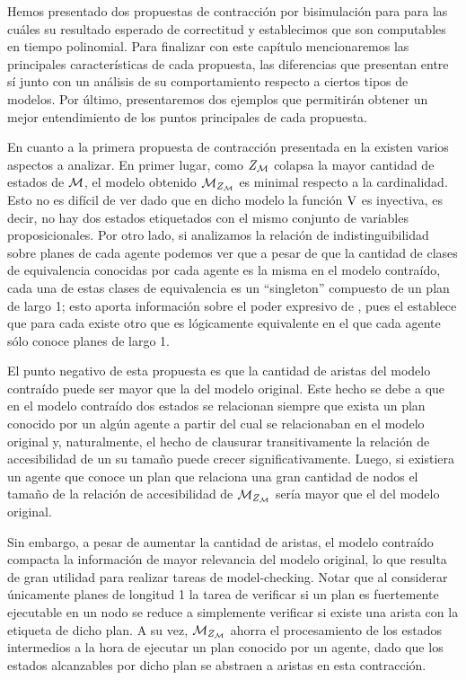 Hemos presentado dos propuestas de contracción por bisimulación para \KHilogic para las cuáles su resultado esperado de correctitud y 
establecimos que son computables en tiempo polinomial. Para finalizar con este capítulo mencionaremos las principales características de 
cada propuesta, las diferencias que presentan entre sí junto con un análisis de su comportamiento respecto a ciertos tipos de modelos. Por 
último, presentaremos dos ejemplos que permitirán obtener un mejor entendimiento de los puntos principales de cada propuesta.

En cuanto a la primera propuesta de contracción presentada en la  existen varios aspectos a analizar. En primer 
lugar, como $Z_{\mathcal{M}}$ colapsa la mayor cantidad de estados de $\mathcal{M}$, el modelo obtenido $\mathcal{M}_{Z_{\mathcal{M}}}$ es minimal respecto a la cardinalidad. 
Esto no es difícil de ver dado que en dicho modelo la función $\mathrm{V}$ es inyectiva, es decir, no hay dos estados etiquetados con el mismo 
conjunto de variables proposicionales. Por otro lado, si analizamos la relación de indistinguibilidad sobre planes de cada agente podemos 
ver que a pesar de que la cantidad de clases de equivalencia conocidas por cada agente es la misma en el modelo contraído, cada una de 
estas clases de equivalencia es un ``singleton'' compuesto de un plan de largo 1; esto aporta información sobre el poder expresivo de 
\KHilogic, pues el  establece que para cada \ults existe otro que es lógicamente equivalente en el que cada 
agente sólo conoce planes de largo 1. 

El punto negativo de esta propuesta es que la cantidad de aristas del modelo contraído puede ser mayor que la del modelo original. Este hecho 
se debe a que en el modelo contraído dos estados se relacionan siempre que exista un plan conocido por un algún agente a partir del cual 
se relacionaban en el modelo original y, naturalmente, el hecho de clausurar transitivamente la relación de accesibilidad de un \ults 
su tamaño puede crecer significativamente. Luego, si existiera un agente que conoce un plan que relaciona una gran cantidad de nodos el  
tamaño de la relación de accesibilidad de $\mathcal{M}_{Z_{\mathcal{M}}}$ sería mayor que el del modelo original. 

Sin embargo, a pesar de aumentar la cantidad de aristas, el modelo contraído compacta la información de mayor relevancia del modelo original, 
lo que resulta de gran utilidad para realizar tareas de model-checking. Notar que al considerar únicamente planes de longitud 
1 la tarea de verificar si un plan es fuertemente ejecutable en un nodo se reduce a simplemente verificar si existe una arista con la etiqueta 
de dicho plan. A su vez, $\mathcal{M}_{Z_{\mathcal{M}}}$ ahorra el procesamiento de los estados intermedios a la hora de ejecutar un plan conocido por un agente, 
dado que los estados alcanzables por dicho plan se abstraen a aristas en esta contracción.

